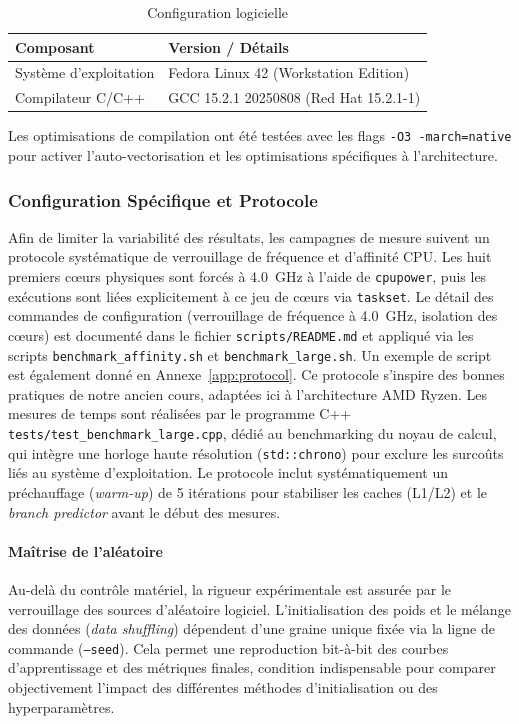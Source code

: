 \documentclass[a4paper,11pt]{article}
\begin{document}
\begin{table}[H]
\centering
\caption{Configuration logicielle}
\label{tab:software}
\begin{tabular}{p{}p{}}
\toprule
\textbf{Composant} & \textbf{Version / Détails} \\
\midrule
Système d'exploitation & Fedora Linux 42 (Workstation Edition) \\
Compilateur C/C++ & GCC 15.2.1 20250808 (Red Hat 15.2.1-1) \\
\bottomrule
\end{tabular}
\end{table}

Les optimisations de compilation ont été testées avec les flags \texttt{-O3 -march=native} pour activer l'auto-vectorisation et les optimisations spécifiques à l'architecture.

\subsubsection{Configuration Spécifique et Protocole}\label{subsec:protocol}

Afin de limiter la variabilité des résultats, les campagnes de mesure suivent un protocole systématique de verrouillage de fréquence et d'affinité CPU. Les huit premiers cœurs physiques sont forcés à 4.0~GHz à l'aide de \texttt{cpupower}, puis les exécutions sont liées explicitement à ce jeu de cœurs via \texttt{taskset}. Le détail des commandes de configuration (verrouillage de fréquence à 4.0~GHz, isolation des cœurs) est documenté dans le fichier \texttt{scripts/README.md} et appliqué via les scripts \texttt{benchmark\_affinity.sh} et \texttt{benchmark\_large.sh}. Un exemple de script est également donné en Annexe~\ref{app:protocol}. Ce protocole s'inspire des bonnes pratiques de notre ancien cours, adaptées ici à l'architecture AMD Ryzen. Les mesures de temps sont réalisées par le programme C++ \texttt{tests/test\_benchmark\_large.cpp}, dédié au benchmarking du noyau de calcul, qui intègre une horloge haute résolution (\texttt{std::chrono}) pour exclure les surcoûts liés au système d'exploitation. Le protocole inclut systématiquement un préchauffage (\emph{warm-up}) de 5 itérations pour stabiliser les caches (L1/L2) et le \emph{branch predictor} avant le début des mesures.

\paragraph{Maîtrise de l'aléatoire}
Au-delà du contrôle matériel, la rigueur expérimentale est assurée par le verrouillage des sources d'aléatoire logiciel. L'initialisation des poids et le mélange des données (\textit{data shuffling}) dépendent d'une graine unique fixée via la ligne de commande (\texttt{--seed}). Cela permet une reproduction bit-à-bit des courbes d'apprentissage et des métriques finales, condition indispensable pour comparer objectivement l'impact des différentes méthodes d'initialisation ou des hyperparamètres.
\end{document}
